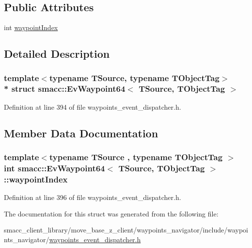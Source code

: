 \subsection*{Public Attributes}
\begin{DoxyCompactItemize}
\item 
int \hyperlink{structsmacc_1_1EvWaypoint64_a390a6320d415c08381e887ebef959958}{waypoint\+Index}
\end{DoxyCompactItemize}


\subsection{Detailed Description}
\subsubsection*{template$<$typename T\+Source, typename T\+Object\+Tag$>$\\*
struct smacc\+::\+Ev\+Waypoint64$<$ T\+Source, T\+Object\+Tag $>$}



Definition at line 394 of file waypoints\+\_\+event\+\_\+dispatcher.\+h.



\subsection{Member Data Documentation}
\subsubsection[{\texorpdfstring{waypoint\+Index}{waypointIndex}}]{\setlength{\rightskip}{0pt plus 5cm}template$<$typename T\+Source , typename T\+Object\+Tag $>$ int {\bf smacc\+::\+Ev\+Waypoint64}$<$ T\+Source, T\+Object\+Tag $>$\+::waypoint\+Index}\hypertarget{structsmacc_1_1EvWaypoint64_a390a6320d415c08381e887ebef959958}{}\label{structsmacc_1_1EvWaypoint64_a390a6320d415c08381e887ebef959958}


Definition at line 396 of file waypoints\+\_\+event\+\_\+dispatcher.\+h.



The documentation for this struct was generated from the following file\+:\begin{DoxyCompactItemize}
\item 
smacc\+\_\+client\+\_\+library/move\+\_\+base\+\_\+z\+\_\+client/waypoints\+\_\+navigator/include/waypoints\+\_\+navigator/\hyperlink{waypoints__event__dispatcher_8h}{waypoints\+\_\+event\+\_\+dispatcher.\+h}\end{DoxyCompactItemize}
